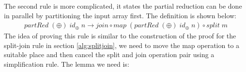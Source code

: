 \documentclass{l4proj}
\begin{document}
The second rule is more complicated, it states the partial reduction can be done in parallel by partitioning the input array first. The definition is shown below:
\begin{align}
    \label{partialreduction:2}
    partRed\; (\oplus)\; id_\oplus\; n \to join \circ map\; (partRed\; (\oplus)\; id_\oplus\; n) \circ split\; m
\end{align}
The idea of proving this rule is similar to the construction of the proof for the split-join rule in section \ref{alg:splitjoin}, we need to move the map operation to a suitable place and then cancel the split and join operation pair using a simplification rule. The lemma we need is:
\begin{code}%
\>[0]\AgdaSpace{}%
\AgdaSymbol{:}%
\>[2295I]\AgdaSymbol{\{}\AgdaSpace{}%
\AgdaSymbol{:}\AgdaSpace{}%
\AgdaSymbol{\}}\AgdaSpace{}%
\AgdaSpace{}%
\AgdaSymbol{\{}\AgdaSpace{}%
\AgdaSymbol{:}\AgdaSpace{}%
\AgdaSymbol{\}}\AgdaSpace{}%
\AgdaSpace{}%
\AgdaSymbol{(}\AgdaSpace{}%
\AgdaSymbol{:}\AgdaSpace{}%
\AgdaSymbol{)}\AgdaSpace{}%
\<%
\\
\>[.][@{}l@{}]\<[2295I]%
\>[19]\AgdaSymbol{(}\AgdaSpace{}%
\AgdaSymbol{:}\AgdaSpace{}%
\AgdaSpace{}%
\AgdaSymbol{)}\AgdaSpace{}%
\AgdaSpace{}%
\AgdaSymbol{(}\AgdaSpace{}%
\AgdaSymbol{:}\AgdaSpace{}%
\AgdaSpace{}%
\AgdaSymbol{(}\AgdaSpace{}%
\AgdaSpace{}%
\AgdaSymbol{)}\AgdaSpace{}%
\AgdaSymbol{(}\AgdaSpace{}%
\AgdaSymbol{))}\AgdaSpace{}%
\<%
\\
%
\>[19]\AgdaSpace{}%
\AgdaSymbol{(}\AgdaSpace{}%
\AgdaSymbol{(}\AgdaSpace{}%
\AgdaSpace{}%
\AgdaSymbol{\{}\AgdaSymbol{\}}\AgdaSpace{}%
\AgdaSymbol{)}\AgdaSpace{}%
\AgdaSymbol{)}\AgdaSpace{}%
\<%
\\
%
\>[19]\AgdaSpace{}%
\AgdaSpace{}%
\AgdaSymbol{\{}\AgdaSymbol{\}}\AgdaSpace{}%
\AgdaSpace{}%
\AgdaSymbol{(}\AgdaSpace{}%
\AgdaSymbol{\{}\AgdaSymbol{\}}\AgdaSpace{}%
\AgdaSymbol{\{}\AgdaSpace{}%
\AgdaSymbol{\}}\AgdaSpace{}%
\AgdaSymbol{)}\<%
\end{code}
\end{document}
